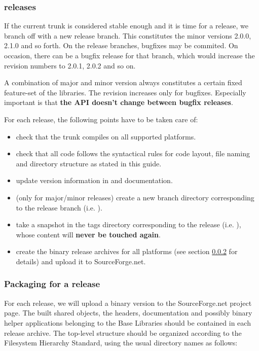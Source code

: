 \subsubsection{ releases}
\label{vista_releases}
If the current trunk is considered stable enough and it is time for a release, we branch off with a new release branch.
This constitutes the minor versions 2.0.0, 2.1.0 and so forth.
On the release branches, bugfixes may be commited. 
On occasion, there can be a bugfix release for that branch, which would increase the revision numbers to 2.0.1, 2.0.2 and so on.

A combination of major and minor version always constitutes a certain fixed feature-set of the  libraries. The revision increases only for bugfixes. Especially important is that \textbf{the API doesn't change between bugfix releases}.

For each release, the following points have to be taken care of:
\begin{itemize}
\item check that the trunk compiles on all supported platforms. %
\item check that all code follows the syntactical rules for code layout, file naming and directory structure as stated in this guide.
\item update version information in  and documentation.
\item (only for major/minor releases) create a new branch directory corresponding to the release branch (i.e. ).
\item take a snapshot in the tags directory corresponding to the release (i.e. ), whose content will \textbf{never be touched again}.
\item create the binary release archives for all platforms (see section \ref{packaging} for details) and upload it to SourceForge.net.
\end{itemize}


\subsubsection{Packaging  for a release}
\label{packaging}

For each  release, we will upload a binary version to the SourceForge.net project page.
The built shared objects, the headers, documentation and possibly binary helper applications belonging to the Base Libraries should be contained in each release archive. 
The top-level structure should be organized according to the Filesystem Hierarchy Standard, using the usual directory names as follows:


